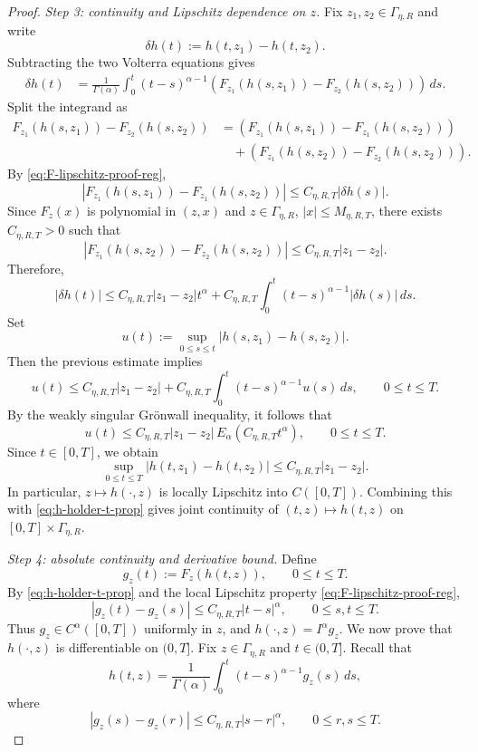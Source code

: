 \documentclass[letterpaper]{article}
\numberwithin{equation}{section}
\theoremstyle{definition}
\theoremstyle{remark}
\begin{document}
\begin{proof}
\medskip
\noindent
\textit{Step 3: continuity and Lipschitz dependence on $z$.}
Fix $z_1,z_2\in\Gamma_{\eta,R}$ and write
\[
  \delta h(t):=h(t,z_1)-h(t,z_2).
\]
Subtracting the two Volterra equations gives
\begin{align*}
  \delta h(t)
  &=
  \frac{1}{\Gamma(\alpha)}
  \int_0^t (t-s)^{\alpha-1}
  \left(F_{z_1}(h(s,z_1))-F_{z_2}(h(s,z_2))\right)\,ds.
\end{align*}
Split the integrand as
\begin{align*}
  F_{z_1}(h(s,z_1))-F_{z_2}(h(s,z_2))
  &=
  \left(F_{z_1}(h(s,z_1))-F_{z_1}(h(s,z_2))\right)
  \\
  &\quad+
  \left(F_{z_1}(h(s,z_2))-F_{z_2}(h(s,z_2))\right).
\end{align*}
By \eqref{eq:F-lipschitz-proof-reg},
\[
  \left|F_{z_1}(h(s,z_1))-F_{z_1}(h(s,z_2))\right|
  \le C_{\eta,R,T}|\delta h(s)|.
\]
Since $F_z(x)$ is polynomial in $(z,x)$ and $z\in\Gamma_{\eta,R}$, $|x|\le
M_{\eta,R,T}$, there exists $C_{\eta,R,T}>0$ such that
\[
  \left|F_{z_1}(h(s,z_2))-F_{z_2}(h(s,z_2))\right|
  \le C_{\eta,R,T}|z_1-z_2|.
\]
Therefore,
\[
  |\delta h(t)|
  \le
  C_{\eta,R,T}|z_1-z_2|t^\alpha
  +
  C_{\eta,R,T}
  \int_0^t (t-s)^{\alpha-1}|\delta h(s)|\,ds.
\]
Set
\[
u(t):=\sup_{0\le s\le t}|h(s,z_1)-h(s,z_2)|.
\]
Then the previous estimate implies
\[
u(t)\le C_{\eta,R,T}|z_1-z_2|
   +C_{\eta,R,T}\int_0^t (t-s)^{\alpha-1}u(s)\,ds,
   \qquad 0\le t\le T.
\]
By the weakly singular Gr\"onwall inequality, it follows that
\[
u(t)\le C_{\eta,R,T}|z_1-z_2|\,E_\alpha(C_{\eta,R,T}t^\alpha),
\qquad 0\le t\le T.
\]
Since $t\in[0,T]$, we obtain
\[
\sup_{0\le t\le T}|h(t,z_1)-h(t,z_2)|
\le C_{\eta,R,T}|z_1-z_2|.
\]
In particular, $z\mapsto h(\cdot,z)$ is locally Lipschitz into $C([0,T])$.
Combining this with \eqref{eq:h-holder-t-prop} gives joint continuity of
$(t,z)\mapsto h(t,z)$ on $[0,T]\times\Gamma_{\eta,R}$.

\medskip
\noindent
\textit{Step 4: absolute continuity and derivative bound.}
Define
\[
  g_z(t):=F_z(h(t,z)),\qquad 0\le t\le T.
\]
By \eqref{eq:h-holder-t-prop} and the local Lipschitz property
\eqref{eq:F-lipschitz-proof-reg},
\[
  |g_z(t)-g_z(s)|\le C_{\eta,R,T}|t-s|^\alpha,
  \qquad 0\le s,t\le T.
\]
Thus $g_z\in C^\alpha([0,T])$ uniformly in $z$, and
$h(\cdot,z)=I^\alpha g_z$.
We now prove that $h(\cdot,z)$ is differentiable on $(0,T]$.
Fix $z\in\Gamma_{\eta,R}$ and $t\in(0,T]$. Recall that
\[
  h(t,z)=\frac{1}{\Gamma(\alpha)}\int_0^t (t-s)^{\alpha-1}g_z(s)\,ds,
\]
where
\[
  |g_z(s)-g_z(r)|\le C_{\eta,R,T}|s-r|^\alpha,
  \qquad 0\le r,s\le T.
\]


\end{proof}
\end{document}
